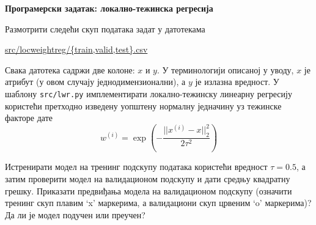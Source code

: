 \item{} {\bf Програмерски задатак: локално-тежинска регресија}

Размотрити следећи скуп података задат у датотекама
\begin{center}
\url{src/locweightreg/{train,valid,test}.csv}
\end{center}
Свака датотека садржи две колоне: $x$ и $y$. У терминологији описаној у уводу, $x$ је атрибут (у овом случају једнодимензионални), а $y$ је излазна вредност. У шаблону \verb|src/lwr.py| имплементирати локално-тежинску линеарну регресију користећи претходно изведену уопштену нормалну једначину уз тежинске факторе дате
\begin{equation*}
 w^{(i)}=\exp\left(-\dfrac{||x^{(i)}-x||_2^2}{2\tau^2}\right)
\end{equation*}

Истренирати модел на тренинг подскупу података користећи вредност $\tau=0.5$, а затим проверити модел на валидационом подскупу и дати средњу квадратну грешку. Приказати предвиђања модела на валидационом подскупу (означити тренинг скуп плавим `x' маркерима, а валидациони скуп црвеним `o' маркерима)? Да ли је модел подучен или преучен?

